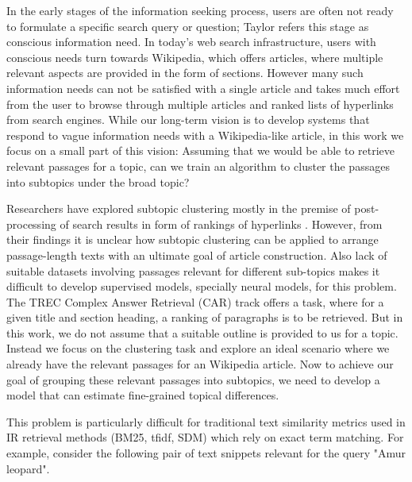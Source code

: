 
In the early stages of the information seeking process, users are often not ready to formulate a specific search query or question; Taylor\cite{taylor2015question} refers this stage as conscious information need. In today's web search infrastructure, users with conscious needs turn towards Wikipedia, which offers articles, where multiple relevant aspects are provided in the form of sections. However many such information needs can not be satisfied with a single article and takes much effort from the user to browse through multiple articles and ranked lists of hyperlinks from search engines. While our long-term vision is to develop systems that respond to vague information needs with a Wikipedia-like article, in this work we focus on a small part of this vision: Assuming that we would be able to retrieve relevant passages for a topic, can we train an algorithm to cluster the passages into subtopics under the broad topic? \par
Researchers have explored subtopic clustering mostly in the premise of post-processing of search results in form of rankings of hyperlinks \cite{bernardini2009full, carpineto2012evaluating}. However, from their findings it is unclear how subtopic clustering can be applied to arrange passage-length texts with an ultimate goal of article construction. Also lack of suitable datasets involving passages relevant for different sub-topics makes it difficult to develop supervised models, specially neural models, for this problem. The TREC Complex Answer Retrieval (CAR) \cite{dietz2017trec} track offers a task, where for a given title and section heading, a ranking of paragraphs is to be retrieved. But in this work, we do not assume that a suitable outline is provided to us for a topic. Instead we focus on the clustering task and explore an ideal scenario where we already have the relevant passages for an Wikipedia article. Now to achieve our goal of grouping these relevant passages into subtopics, we need to develop a model that can estimate fine-grained topical differences.

This problem is particularly difficult for traditional text similarity metrics used in IR retrieval methods (BM25, tfidf, SDM) which rely on exact term matching. For example, consider the following pair of text snippets relevant for the query "Amur leopard".

\noindent{}
\noindent{}

